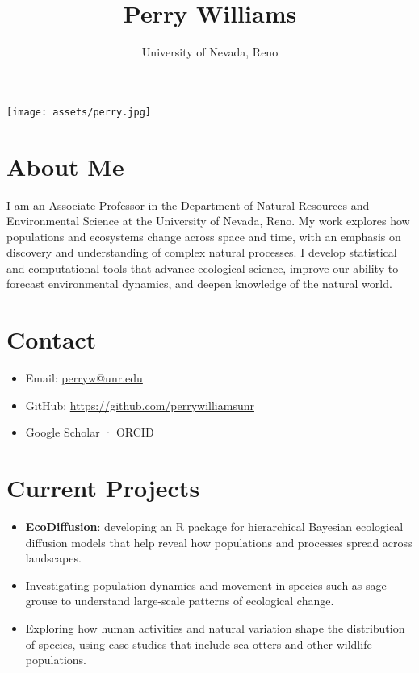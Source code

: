 \title{Perry Williams}
\author{University of Nevada, Reno}
\date{}

\maketitle

\begin{center}
  \texttt{[image: assets/perry.jpg]}
\end{center}

\section*{About Me}
I am an Associate Professor in the Department of Natural Resources and Environmental Science at the University of Nevada, Reno.  
My work explores how populations and ecosystems change across space and time, with an emphasis on discovery and understanding of complex natural processes.  
I develop statistical and computational tools that advance ecological science, improve our ability to forecast environmental dynamics, and deepen knowledge of the natural world.


\section*{Contact}
\begin{itemize}
  \item Email: \href{mailto:perryw@unr.edu}{perryw@unr.edu}
  \item GitHub: \url{https://github.com/perrywilliamsunr}
  \item Google Scholar · ORCID
\end{itemize}

\section*{Current Projects}
\begin{itemize}
  \item \textbf{EcoDiffusion}: developing an R package for hierarchical Bayesian ecological diffusion models that help reveal how populations and processes spread across landscapes.
  \item Investigating population dynamics and movement in species such as sage grouse to understand large-scale patterns of ecological change.
  \item Exploring how human activities and natural variation shape the distribution of species, using case studies that include sea otters and other wildlife populations.
\end{itemize}

